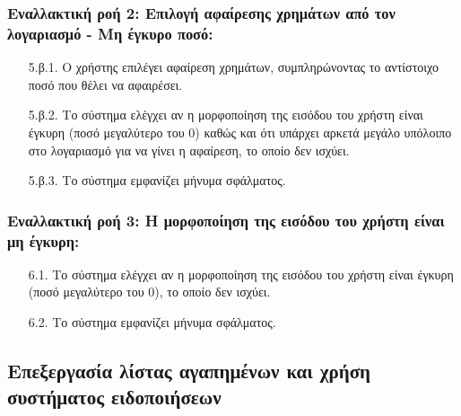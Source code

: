 \documentclass[12pt,a4paper]{article}
\begin{document}
\subsubsection*{Εναλλακτική ροή 2: Επιλογή αφαίρεσης χρημάτων από τον λογαριασμό - Μη έγκυρο ποσό:}
\begin{enumerate}
    \item [5.β.1.] Ο χρήστης επιλέγει αφαίρεση χρημάτων, συμπληρώνοντας το αντίστοιχο ποσό που θέλει να αφαιρέσει.
    \item [5.β.2.] Το σύστημα ελέγχει αν η μορφοποίηση της εισόδου του χρήστη είναι έγκυρη (ποσό μεγαλύτερο του 0) καθώς και ότι υπάρχει αρκετά μεγάλο υπόλοιπο στο λογαριασμό για να γίνει η αφαίρεση, το οποίο δεν ισχύει.
    \item [5.β.3.] Το σύστημα εμφανίζει μήνυμα σφάλματος.
\end{enumerate}

\subsubsection*{Εναλλακτική ροή 3: Η μορφοποίηση της εισόδου του χρήστη είναι μη έγκυρη:}
\begin{enumerate}
    \item [6.1.] Το σύστημα ελέγχει αν η μορφοποίηση της εισόδου του χρήστη είναι έγκυρη (ποσό μεγαλύτερο του 0), το οποίο δεν ισχύει.
    \item [6.2.] Το σύστημα εμφανίζει μήνυμα σφάλματος.
\end{enumerate}

\subsection{Επεξεργασία λίστας αγαπημένων και χρήση \\συστήματος ειδοποιήσεων}
\end{document}
